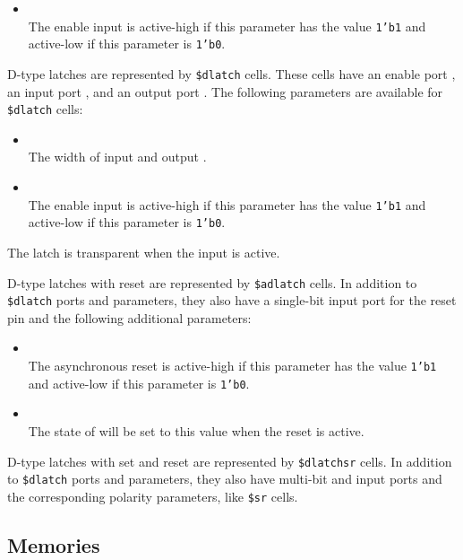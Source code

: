 \begin{itemize}
\item {} \\
The enable input is active-high if this parameter has the value {\tt 1'b1} and active-low
if this parameter is {\tt 1'b0}.
\end{itemize}

D-type latches are represented by {\tt \$dlatch} cells.  These cells have an enable port ,
an input port , and an output port .  The following parameters are available for {\tt \$dlatch} cells:

\begin{itemize}
\item {} \\
The width of input  and output .

\item {} \\
The enable input is active-high if this parameter has the value {\tt 1'b1} and active-low
if this parameter is {\tt 1'b0}.
\end{itemize}

The latch is transparent when the  input is active.

D-type latches with reset are represented by {\tt \$adlatch} cells.  In addition to {\tt \$dlatch}
ports and parameters, they also have a single-bit  input port for the reset pin and the following additional parameters:

\begin{itemize}
\item {} \\
The asynchronous reset is active-high if this parameter has the value {\tt 1'b1} and active-low
if this parameter is {\tt 1'b0}.

\item {} \\
The state of  will be set to this value when the reset is active.
\end{itemize}

D-type latches with set and reset are represented by {\tt \$dlatchsr} cells.
In addition to {\tt \$dlatch} ports and parameters, they also have multi-bit
 and  input ports and the corresponding polarity parameters, like
{\tt \$sr} cells.

\subsection{Memories}
\label{sec:memcells}

